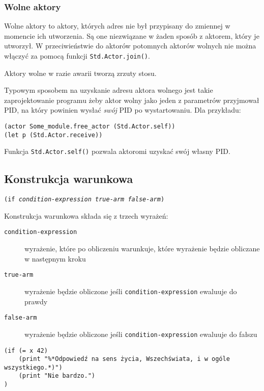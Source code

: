 \documentclass[11pt,oneside,a4paper,titlepage,onecolumn]{article}
\begin{document}
\subsubsection{Wolne aktory}

Wolne aktory to aktory, których adres nie był przypisany do zmiennej w momencie ich utworzenia. Są one
niezwiązane w żaden sposób z aktorem, który je utworzył. W przeciwieństwie do aktorów potomnych aktorów
wolnych nie można włączyć za pomocą funkcji \texttt{Std.Actor.join()}.

Aktory wolne w razie awarii tworzą zrzuty stosu.

Typowym sposobem na uzyskanie adresu aktora wolnego jest takie zaprojektowanie programu żeby aktor wolny jako
jeden z parametrów przyjmował PID, na który powinien wysłać \emph{swój} PID po wystartowaniu. Dla przykładu:

\begin{lstlisting}
(actor Some_module.free_actor (Std.Actor.self))
(let p (Std.Actor.receive))
\end{lstlisting}

Funkcja \texttt{Std.Actor.self()} pozwala aktoromi uzyskać swój własny PID.

\subsection{Konstrukcja warunkowa}

\texttt{(if \emph{condition-expression} \emph{true-arm} \emph{false-arm})}
\newline

Konstrukcja warunkowa składa się z trzech wyrażeń:

\begin{description}
    \item[\texttt{condition-expression}] wyrażenie, które po obliczeniu warunkuje, które wyrażenie będzie
        obliczane w następnym kroku
    \item[\texttt{true-arm}] wyrażenie będzie obliczone jeśli \texttt{condition-expression} ewaluuje do prawdy
    \item[\texttt{false-arm}] wyrażenie będzie obliczone jeśli \texttt{condition-expression} ewaluuje do
        fałszu
\end{description}

\begin{lstlisting}
(if (= x 42)
    (print "%*Odpowiedź na sens życia, Wszechświata, i w ogóle wszystkiego.*)")
    (print "Nie bardzo.")
)
\end{lstlisting}
\end{document}

